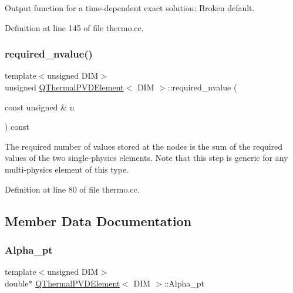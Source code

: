 Output function for a time-\/dependent exact solution\+: Broken default. 



Definition at line 145 of file thermo.\+cc.

\mbox{\label{classQThermalPVDElement_a55025994fc3d2799fde6f9c1142340af}} 
\subsubsection{\texorpdfstring{required\+\_\+nvalue()}{required\_nvalue()}}
{\footnotesize\ttfamily template$<$unsigned D\+IM$>$ \\
unsigned \hyperlink{classQThermalPVDElement}{Q\+Thermal\+P\+V\+D\+Element}$<$ D\+IM $>$\+::required\+\_\+nvalue (\begin{DoxyParamCaption}\item[{const unsigned \&}]{n }\end{DoxyParamCaption}) const\hspace{0.3cm}{\ttfamily [inline]}}



The required number of values stored at the nodes is the sum of the required values of the two single-\/physics elements. Note that this step is generic for any multi-\/physics element of this type. 



Definition at line 80 of file thermo.\+cc.



\subsection{Member Data Documentation}
\mbox{\label{classQThermalPVDElement_a97267a52ceec2a2153b23e18e2a2c631}} 
\subsubsection{\texorpdfstring{Alpha\+\_\+pt}{Alpha\_pt}}
{\footnotesize\ttfamily template$<$unsigned D\+IM$>$ \\
double$\ast$ \hyperlink{classQThermalPVDElement}{Q\+Thermal\+P\+V\+D\+Element}$<$ D\+IM $>$\+::Alpha\+\_\+pt\hspace{0.3cm}{\ttfamily [private]}}



